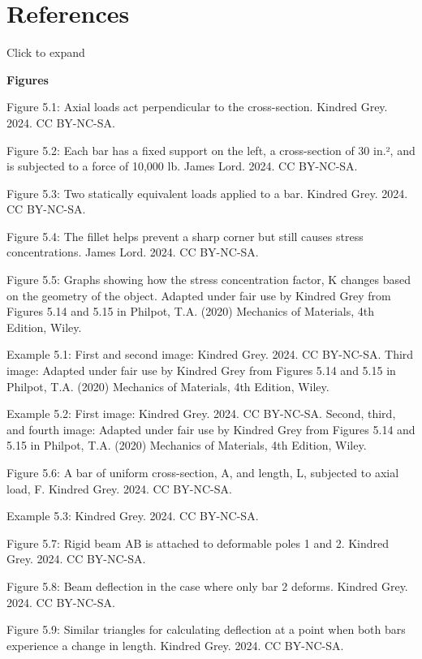 \documentclass[
  letterpaper,
  DIV=11,
  numbers=noendperiod]{scrreprt}
\theoremstyle{definition}
\theoremstyle{remark}
\begin{document}
\section*{References}\label{references-4}


Click to expand

\textbf{Figures}

Figure 5.1: Axial loads act perpendicular to the cross-section. Kindred
Grey. 2024. CC BY-NC-SA.

Figure 5.2: Each bar has a fixed support on the left, a cross-section of
30 in.², and is subjected to a force of 10,000 lb. James Lord. 2024. CC
BY-NC-SA.

Figure 5.3: Two statically equivalent loads applied to a bar. Kindred
Grey. 2024. CC BY-NC-SA.

Figure 5.4: The fillet helps prevent a sharp corner but still causes
stress concentrations. James Lord. 2024. CC BY-NC-SA.

Figure 5.5: Graphs showing how the stress concentration factor, K
changes based on the geometry of the object. Adapted under fair use by
Kindred Grey from Figures 5.14 and 5.15 in Philpot, T.A. (2020)
Mechanics of Materials, 4th Edition, Wiley.

Example 5.1: First and second image: Kindred Grey. 2024. CC BY-NC-SA.
Third image: Adapted under fair use by Kindred Grey from Figures 5.14
and 5.15 in Philpot, T.A. (2020) Mechanics of Materials, 4th Edition,
Wiley.

Example 5.2: First image: Kindred Grey. 2024. CC BY-NC-SA. Second,
third, and fourth image: Adapted under fair use by Kindred Grey from
Figures 5.14 and 5.15 in Philpot, T.A. (2020) Mechanics of Materials,
4th Edition, Wiley.

Figure 5.6: A bar of uniform cross-section, A, and length, L, subjected
to axial load, F. Kindred Grey. 2024. CC BY-NC-SA.

Example 5.3: Kindred Grey. 2024. CC BY-NC-SA.

Figure 5.7: Rigid beam AB is attached to deformable poles 1 and 2.
Kindred Grey. 2024. CC BY-NC-SA.

Figure 5.8: Beam deflection in the case where only bar 2 deforms.
Kindred Grey. 2024. CC BY-NC-SA.

Figure 5.9: Similar triangles for calculating deflection at a point when
both bars experience a change in length. Kindred Grey. 2024. CC
BY-NC-SA.
\end{document}
